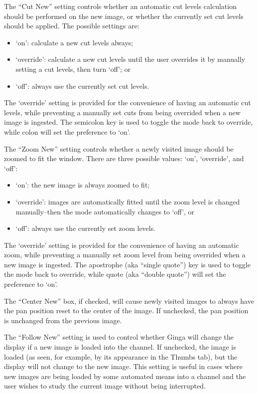 \documentclass[11pt]{report}
\begin{document}
\label{pref:cutnew}
The ``Cut New'' setting controls whether an automatic cut levels
calculation should be performed on the new image, or whether the
currently set cut levels should be applied.  The possible settings are:
\begin{itemize}
\item `on': calculate a new cut levels always;
\item `override': calculate a new cut levels until the user overrides
  it by manually setting a cut levels, then turn `off'; or
\item `off': always use the currently set cut levels.
\end{itemize}
The `override' setting is provided for the convenience of having an
automatic cut levels, while preventing a manually set cuts from being
overrided when a new image is ingested.  The semicolon key is used to
toggle the mode back to override, while colon will set the preference to
`on'. 

\label{pref:zoomnew}
The ``Zoom New'' setting controls whether a newly visited image should
be zoomed to fit the window.  There are three possible values: `on',
`override', and `off':
\begin{itemize}
\item `on': the new image is always zoomed to fit;
\item `override': images are automatically fitted until the zoom level is
changed manually--then the mode automatically changes to `off', or
\item `off': always use the currently set zoom levels.
\end{itemize}
The `override' setting is provided for the convenience of having an
automatic zoom, while preventing a manually set zoom level from being
overrided when a new image is ingested.  The apostrophe (aka ``single
quote'') key is used to toggle the mode back to override, while quote
(aka ``double quote'') will set the preference to `on'. 

The ``Center New'' box, if checked, will cause newly visited images to
always have the pan position reset to the center of the image.  If
unchecked, the pan position is unchanged from the previous image.

The ``Follow New'' setting is used to control whether Ginga will change
the display if a new image is loaded into the channel.  If unchecked,
the image is loaded (as seen, for example, by its appearance in the
Thumbs tab), but the display will not change to the new image.  This
setting is useful in cases where new images are being loaded by some
automated means into a channel and the user wishes to study the current
image without being interrupted.
\end{document}
